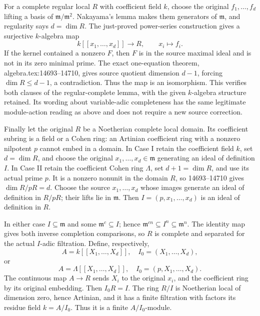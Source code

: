 For a complete regular local \(R\) with coefficient field \(k\), choose the original \(f_1,\ldots,f_d\) lifting a basis of \(\mathfrak m/\mathfrak m^2\). Nakayama's lemma makes them generators of \(\mathfrak m\), and regularity says \(d=\dim R\). The just-proved power-series construction gives a surjective \(k\)-algebra map \[
 k[[x_1,\ldots,x_d]]\longrightarrow R,\qquad x_i\longmapsto f_i.
\] If the kernel contained a nonzero \(F\), then \(F\) is in the source maximal ideal and is not in its zero minimal prime. The exact one-equation theorem, algebra.\AlgebraIdentifierBreak{}tex:\AlgebraIdentifierBreak{}14693--\AlgebraIdentifierBreak{}14710, gives source quotient dimension \(d-1\), forcing \(\dim R\leq d-1\), a contradiction. Thus the map is an isomorphism. This verifies both clauses of the regular-complete lemma, with the given \(k\)-algebra structure retained. Its wording about variable-adic completeness has the same legitimate module-action reading as above and does not require a new source correction.

Finally let the original \(R\) be a Noetherian complete local domain. Its coefficient subring is a field or a Cohen ring: an Artinian coefficient ring with a nonzero nilpotent \(p\) cannot embed in a domain. In Case I retain the coefficient field \(k\), set \(d=\dim R\), and choose the original \(x_1,\ldots,x_d\in\mathfrak m\) generating an ideal of definition \(I\). In Case II retain the coefficient Cohen ring \(\Lambda\), set \(d+1=\dim R\), and use its actual prime \(p\). It is a nonzero nonunit in the domain \(R\), so 14693--14710 gives \(\dim R/pR=d\). Choose the source \(x_1,\ldots,x_d\) whose images generate an ideal of definition in \(R/pR\); their lifts lie in \(\mathfrak m\). Then \(I=(p,x_1,\ldots,x_d)\) is an ideal of definition in \(R\).

In either case \(I\subseteq\mathfrak m\) and some \(\mathfrak m^c\subseteq I\); hence \(\mathfrak m^{cn}\subseteq I^n\subseteq\mathfrak m^n\). The identity map gives both inverse completion comparisons, so \(R\) is complete and separated for the actual \(I\)-adic filtration. Define, respectively, \[
 A=k[[X_1,\ldots,X_d]],\quad I_0=(X_1,\ldots,X_d),
\] or \[
 A=\Lambda[[X_1,\ldots,X_d]],\quad I_0=(p,X_1,\ldots,X_d).
\] The continuous map \(A\to R\) sends \(X_i\) to the original \(x_i\), and the coefficient ring by its original embedding. Then \(I_0R=I\). The ring \(R/I\) is Noetherian local of dimension zero, hence Artinian, and it has a finite filtration with factors its residue field \(k=A/I_0\). Thus it is a finite \(A/I_0\)-module.

